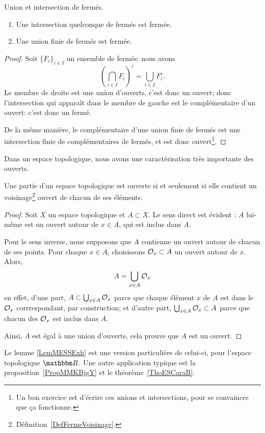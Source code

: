 \begin{lemma}   \label{LemQYUJwPC}
    Union et intersection de fermés.
    \begin{enumerate}
        \item
            Une intersection quelconque de fermés est fermée.
        \item       \label{ItemKJYVooMBmMbG}
            Une union finie de fermés est fermée.
    \end{enumerate}
\end{lemma}

\begin{proof}
    Soit \( \{ F_i \}_{i\in I} \) un ensemble de fermés; nous avons
    \begin{equation}
        \left( \bigcap_{i\in I}F_i \right)^c=\bigcup_{i\in I}F_i^c.
    \end{equation}
    Le membre de droite est une union d'ouverts, c'est donc un ouvert; donc l'intersection qui apparaît dans le membre de gauche est le complémentaire d'un ouvert: c'est donc un fermé.

    De la même manière, le complémentaire d'une union finie de fermés est une intersection finie de complémentaires de fermés, et est donc ouvert\footnote{Un bon exercice est d'écrire ces unions et intersections, pour se convaincre que ça fonctionne.}.
\end{proof}

Dans un espace topologique, nous avons une caractérisation très importante des ouverts.
\begin{theorem}		\label{ThoPartieOUvpartouv}
    Une partie d'un espace topologique est ouverte si et seulement si elle contient un voisinage\footnote{Définition~\ref{DefFermeVoisinage}.} ouvert de chacun de ses éléments.
\end{theorem}

\begin{proof}
    Soit \( X\) un espace topologique et \( A\subset X\). Le sens direct est évident : $A$ lui-même est un ouvert autour de $x\in A$, qui est inclus dans $A$.

Pour le sens inverse, nous supposons que \( A\) contienne un ouvert autour de chacun de ses points. Pour chaque $x\in A$, choisissons $\mathcal{O}_x\subset A$ un ouvert autour de $x$. Alors,
\begin{equation}	\label{EqAUniondesOx}
	A=\bigcup_{x\in A}\mathcal{O}_x
\end{equation}
en effet, d'une part, $A\subset\bigcup_{x\in A}\mathcal{O}_x$ parce que chaque élément $x$ de $A$ est dans le $\mathcal{O}_x$ corrrespondant, par construction; et d'autre part, $\bigcup_{x\in A}\mathcal{O}_x\subset A$ parce que chacun des $\mathcal{O}_x$ est inclus dans $A$.

Ainsi, $A$ est égal à une union d'ouverts, cela prouve que $A$ est un ouvert.
\end{proof}
Le lemme \ref{LemMESSExh} est une version particulière de celui-ci, pour l'espace topologique \( \eR \). Une autre application typique est la proposition~\ref{PropMMKBjgY} et le théorème~\ref{ThoESCaraB}.

